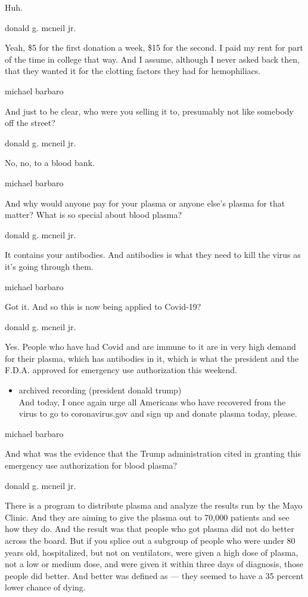 Huh.

donald g. mcneil jr.

Yeah, \$5 for the first donation a week, \$15 for the second. I paid my
rent for part of the time in college that way. And I assume, although I
never asked back then, that they wanted it for the clotting factors they
had for hemophiliacs.

michael barbaro

And just to be clear, who were you selling it to, presumably not like
somebody off the street?

donald g. mcneil jr.

No, no, to a blood bank.

michael barbaro

And why would anyone pay for your plasma or anyone else's plasma for
that matter? What is so special about blood plasma?

donald g. mcneil jr.

It contains your antibodies. And antibodies is what they need to kill
the virus as it's going through them.

michael barbaro

Got it. And so this is now being applied to Covid-19?

donald g. mcneil jr.

Yes. People who have had Covid and are immune to it are in very high
demand for their plasma, which has antibodies in it, which is what the
president and the F.D.A. approved for emergency use authorization this
weekend.

\begin{itemize}
\tightlist
\item
  archived recording (president donald trump)\\
  And today, I once again urge all Americans who have recovered from the
  virus to go to coronavirus.gov and sign up and donate plasma today,
  please.
\end{itemize}

michael barbaro

And what was the evidence that the Trump administration cited in
granting this emergency use authorization for blood plasma?

donald g. mcneil jr.

There is a program to distribute plasma and analyze the results run by
the Mayo Clinic. And they are aiming to give the plasma out to 70,000
patients and see how they do. And the result was that people who got
plasma did not do better across the board. But if you splice out a
subgroup of people who were under 80 years old, hospitalized, but not on
ventilators, were given a high dose of plasma, not a low or medium dose,
and were given it within three days of diagnosis, those people did
better. And better was defined as --- they seemed to have a 35 percent
lower chance of dying.

